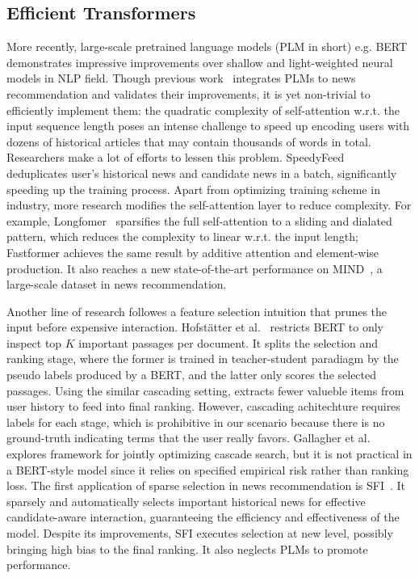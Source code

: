 \documentclass[sigconf,anonymous]{acmart}
\begin{document}
\subsection{Efficient Transformers}
More recently, large-scale pretrained language models (PLM in short) e.g. BERT~\cite{Bert} demonstrates impressive improvements over shallow and light-weighted neural models in NLP field. Though previous work~\cite{wu_newsPLM} integrates PLMs to news recommendation and validates their improvements, it is yet non-trivial to efficiently implement them: the quadratic complexity of self-attention w.r.t. the input sequence length poses an intense challenge to speed up encoding users with dozens of historical articles that may contain thousands of words in total. Researchers make a lot of efforts to lessen this problem. SpeedyFeed~\cite{xiao_speedy} deduplicates user's historical news and candidate news in a batch, significantly speeding up the training process. Apart from optimizing training scheme in industry, more research modifies the self-attention layer to reduce complexity. For example, Longfomer~\cite{Longformer} sparsifies the full self-attention to a sliding and dialated pattern, which reduces the complexity to linear w.r.t. the input length; Fastformer achieves the same result by additive attention and element-wise production. It also reaches a new state-of-the-art performance on MIND~\cite{wu_MIND}, a large-scale dataset in news recommendation.

Another line of research followes a feature selection intuition that prunes the input before expensive interaction. Hofstätter et al.~\cite{Intra-Document-Cascading}
restricts BERT to only inspect top $K$ important passages per document. It splits the selection and ranking stage, where the former is trained in teacher-student paradiagm by the pseudo labels produced by a BERT, and the latter only scores the selected passages. Using the similar cascading setting, \citet{ali_SIM} extracts fewer valueble items from user history to feed into final ranking. However, cascading achitechture requires labels for each stage, which is prohibitive in our scenario because there is no ground-truth indicating terms that the user really favors. Gallagher et al.~\cite{gallagher_joint_cascade} explores framework for jointly optimizing cascade search, but it is not practical in a BERT-style model since it relies on specified empirical risk rather than ranking loss. The first application of sparse selection in news recommendation is SFI~\cite{zpt}. It sparsely and automatically selects important historical news for effective candidate-aware interaction, guaranteeing the efficiency and effectiveness of the model. Despite its improvements, SFI executes selection at new level, possibly bringing high bias to the final ranking. It also neglects PLMs to promote performance.
\end{document}
